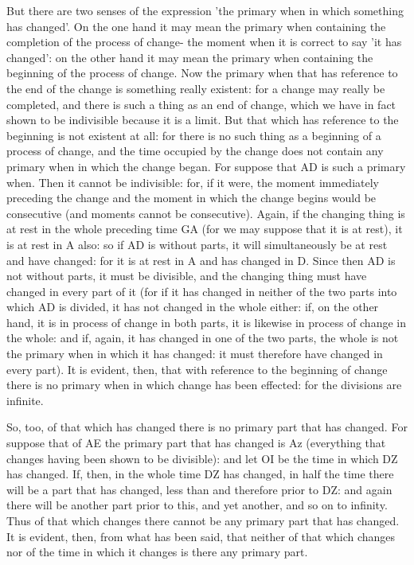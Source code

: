 But there are two senses of the expression 'the primary when in which
something has changed'. On the one hand it may mean the primary when
containing the completion of the process of change- the moment when
it is correct to say 'it has changed': on the other hand it may mean
the primary when containing the beginning of the process of change.
Now the primary when that has reference to the end of the change is
something really existent: for a change may really be completed, and
there is such a thing as an end of change, which we have in fact shown
to be indivisible because it is a limit. But that which has reference
to the beginning is not existent at all: for there is no such thing
as a beginning of a process of change, and the time occupied by the
change does not contain any primary when in which the change began.
For suppose that AD is such a primary when. Then it cannot be indivisible:
for, if it were, the moment immediately preceding the change and the
moment in which the change begins would be consecutive (and moments
cannot be consecutive). Again, if the changing thing is at rest in
the whole preceding time GA (for we may suppose that it is at rest),
it is at rest in A also: so if AD is without parts, it will simultaneously
be at rest and have changed: for it is at rest in A and has changed
in D. Since then AD is not without parts, it must be divisible, and
the changing thing must have changed in every part of it (for if it
has changed in neither of the two parts into which AD is divided,
it has not changed in the whole either: if, on the other hand, it
is in process of change in both parts, it is likewise in process of
change in the whole: and if, again, it has changed in one of the two
parts, the whole is not the primary when in which it has changed:
it must therefore have changed in every part). It is evident, then,
that with reference to the beginning of change there is no primary
when in which change has been effected: for the divisions are infinite.

So, too, of that which has changed there is no primary part that has
changed. For suppose that of AE the primary part that has changed
is Az (everything that changes having been shown to be divisible):
and let OI be the time in which DZ has changed. If, then, in the whole
time DZ has changed, in half the time there will be a part that has
changed, less than and therefore prior to DZ: and again there will
be another part prior to this, and yet another, and so on to infinity.
Thus of that which changes there cannot be any primary part that has
changed. It is evident, then, from what has been said, that neither
of that which changes nor of the time in which it changes is there
any primary part. 


